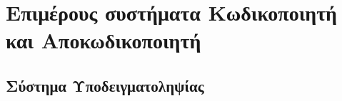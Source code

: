 \chapter{Επιμέρους συστήματα Κωδικοποιητή και Αποκωδικοποιητή}

\section{Σύστημα Υποδειγματοληψίας}
